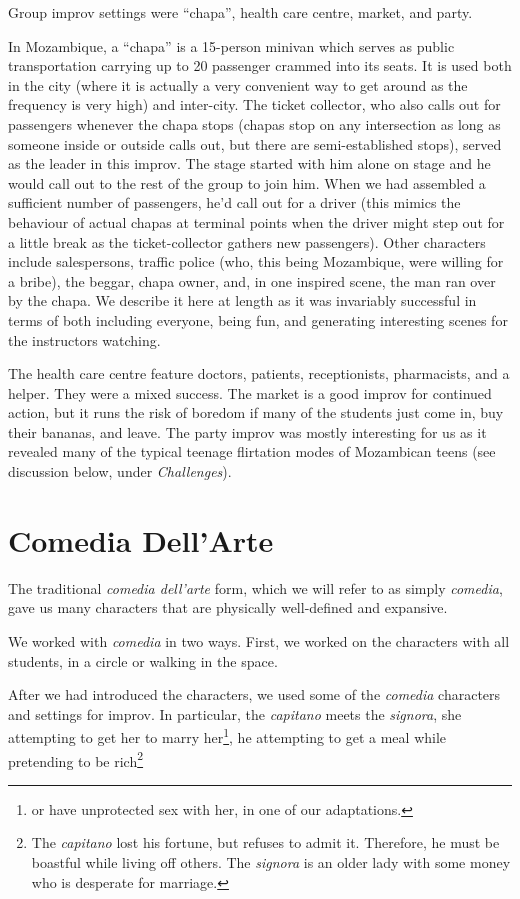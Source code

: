 \documentclass[article,twocolumn,twoside]{memoir}
\begin{document}
Group improv settings were ``chapa'', health care centre, market, and party.

In Mozambique, a ``chapa'' is a 15-person minivan which serves as public
transportation carrying up to 20 passenger crammed into its seats. It is used
both in the city (where it is actually a very convenient way to get around as
the frequency is very high) and inter-city. The ticket collector, who also
calls out for passengers whenever the chapa stops (chapas stop on any
intersection as long as someone inside or outside calls out, but there are
semi-established stops), served as the leader in this improv. The stage started
with him alone on stage and he would call out to the rest of the group to join
him. When we had assembled a sufficient number of passengers, he'd call out for
a driver (this mimics the behaviour of actual chapas at terminal points when
the driver might step out for a little break as the ticket-collector gathers
new passengers). Other characters include salespersons, traffic police (who,
this being Mozambique, were willing for a bribe), the beggar, chapa owner, and,
in one inspired scene, the man ran over by the chapa. We describe it here at
length as it was invariably successful in terms of both including everyone,
being fun, and generating interesting scenes for the instructors watching.

The health care centre feature doctors, patients, receptionists, pharmacists,
and a helper. They were a mixed success. The market is a good improv for
continued action, but it runs the risk of boredom if many of the students just
come in, buy their bananas, and leave. The party improv was mostly interesting
for us as it revealed many of the typical teenage flirtation modes of
Mozambican teens (see discussion below, under \emph{Challenges}).

\section{Comedia Dell'Arte}

The traditional \textit{comedia dell'arte} form, which we will refer to as
simply \textit{comedia}, gave us many characters that are physically
well-defined and expansive.

We worked with \textit{comedia} in two ways. First, we worked on the characters
with all students, in a circle or walking in the space.

After we had introduced the characters, we used some of the \textit{comedia}
characters and settings for improv. In particular, the \textit{capitano} meets
the \textit{signora}, she attempting to get her to marry her\footnote{or have
unprotected sex with her, in one of our adaptations.}, he attempting to get a
meal while pretending to be rich\footnote{The \textit{capitano} lost his
fortune, but refuses to admit it. Therefore, he must be boastful while living
off others. The \textit{signora} is an older lady with some money who is
desperate for marriage.}
\end{document}
